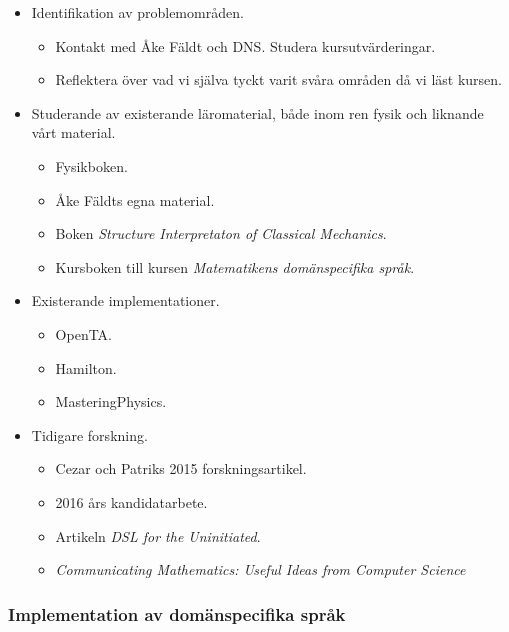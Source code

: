 \documentclass[12pt,a4paper]{article}
\begin{document}
\begin{itemize}
    \item Identifikation av problemområden.
        \begin{itemize}
            \item Kontakt med Åke Fäldt och DNS. Studera kursutvärderingar.
            \item Reflektera över vad vi själva tyckt varit svåra områden då vi läst kursen.
        \end{itemize}
    \item Studerande av existerande läromaterial, både inom ren fysik och liknande vårt material.
        \begin{itemize}
            \item Fysikboken.
            \item Åke Fäldts egna material.
            \item Boken \textit{Structure Interpretaton of Classical Mechanics}\cite{SICM}.
            \item Kursboken till kursen \textit{Matematikens domänspecifika språk}.
        \end{itemize}
    \item Existerande implementationer.
        \begin{itemize}
            \item OpenTA.
            \item Hamilton.
            \item MasteringPhysics.
        \end{itemize}
    \item Tidigare forskning.
        \begin{itemize}
            \item Cezar och Patriks 2015 forskningsartikel.
            \item 2016 års kandidatarbete.
            \item Artikeln \textit{DSL for the Uninitiated}.
            \item \textit{Communicating Mathematics: Useful Ideas from Computer Science}
        \end{itemize}
\end{itemize}

\subsubsection*{Implementation av domänspecifika språk}
\end{document}
